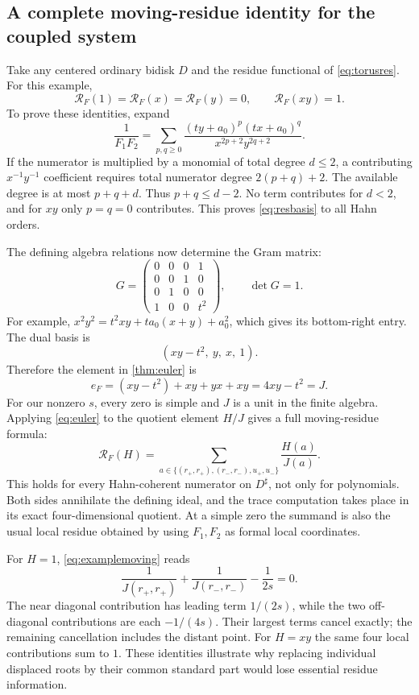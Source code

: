 \documentclass[11pt,letterpaper]{article}
\theoremstyle{definition}
\theoremstyle{remark}
\newcommand{\sh}{^{\sharp}}
\numberwithin{equation}{section}
\begin{document}
\subsection{A complete moving-residue identity for the coupled system}
Take any centered ordinary bidisk $D$ and the residue functional of \eqref{eq:torusres}. For this example,
\begin{equation}\label{eq:resbasis}
 \mathcal R_F(1)=\mathcal R_F(x)=\mathcal R_F(y)=0,
 \qquad\mathcal R_F(xy)=1.
\end{equation}
To prove these identities, expand
\[
 \frac1{F_1F_2}
 =\sum_{p,q\geq0}
 \frac{(ty+a_0)^p(tx+a_0)^q}{x^{2p+2}y^{2q+2}}.
\]
If the numerator is multiplied by a monomial of total degree $d\leq2$, a contributing $x^{-1}y^{-1}$ coefficient requires total numerator degree $2(p+q)+2$. The available degree is at most $p+q+d$. Thus $p+q\leq d-2$. No term contributes for $d<2$, and for $xy$ only $p=q=0$ contributes. This proves \eqref{eq:resbasis} to all Hahn orders.

The defining algebra relations now determine the Gram matrix:
\begin{equation}\label{eq:Gexample}
 G=\begin{pmatrix}
 0&0&0&1\\
 0&0&1&0\\
 0&1&0&0\\
 1&0&0&t^2
 \end{pmatrix},\qquad\det G=1.
\end{equation}
For example, $x^2y^2=t^2xy+ta_0(x+y)+a_0^2$, which gives its bottom-right entry. The dual basis is
\[
 (xy-t^2,\ y,\ x,\ 1).
\]
Therefore the element in \cref{thm:euler} is
\[
 e_F=(xy-t^2)+xy+yx+xy=4xy-t^2=J.
\]
For our nonzero $s$, every zero is simple and $J$ is a unit in the finite algebra. Applying \eqref{eq:euler} to the quotient element $H/J$ gives a full moving-residue formula:
\begin{equation}\label{eq:examplemoving}
 \boxed{\displaystyle
 \mathcal R_F(H)=\sum_{a\in\{(r_+,r_+),(r_-,r_-),u_+,u_-\}}
 \frac{H(a)}{J(a)}.}
\end{equation}
This holds for every Hahn-coherent numerator on $D\sh$, not only for polynomials. Both sides annihilate the defining ideal, and the trace computation takes place in its exact four-dimensional quotient. At a simple zero the summand is also the usual local residue obtained by using $F_1,F_2$ as formal local coordinates.

For $H=1$, \eqref{eq:examplemoving} reads
\begin{equation}\label{eq:cancel}
 \frac1{J(r_+,r_+)}+\frac1{J(r_-,r_-)}-\frac1{2s}=0.
\end{equation}
The near diagonal contribution has leading term $1/(2s)$, while the two off-diagonal contributions are each $-1/(4s)$. Their largest terms cancel exactly; the remaining cancellation includes the distant point. For $H=xy$ the same four local contributions sum to $1$. These identities illustrate why replacing individual displaced roots by their common standard part would lose essential residue information.
\end{document}
